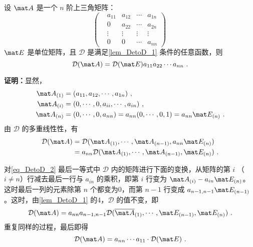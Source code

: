 \begin{lemma}{}\label{lem_DetoD_2}
设 $\mat A$ 是一个 $n$ 阶上三角矩阵：
\begin{equation}
\begin{pmatrix}
&a_{11}&a_{12}&\cdots&a_{1n}\\
&0&a_{22}&\cdots&a_{2n}\\
&\vdots&\vdots&\vdots&\vdots\\
&0&0&\cdots&a_{nn}
\end{pmatrix}~
\end{equation}
$\mat E$ 是单位矩阵，且 $\mathcal D$ 是满足\autoref{lem_DetoD_1} 条件的任意函数，则
\begin{equation}
\mathcal D(\mat A)=\mathcal D(\mat E)a_{11}a_{22}\cdots a_{nn}~.
\end{equation}
\end{lemma}

\textbf{证明：}显然，
\begin{equation}
\begin{aligned}
\mat A_{(1)}&=(a_{11},a_{12},\cdots,a_{1n})~,\\
\mat A_{(i)}&=(0,\cdots,0,a_{ii},\cdots,a_{in})~,\\
\mat A_{(n)}&=(0,\cdots,0,a_{nn})=a_{nn}(0,\cdots,0,1)=a_{nn}\mat E_{(n)}~.
\end{aligned}
\end{equation}
由 $\mathcal D$ 的多重线性性，有
\begin{equation}\label{eq_DetoD_2}
\begin{aligned}
\mathcal D(\mat A)&=\mathcal D(\mat A_{(1)},\cdots,\mat A_{(n-1)},a_{nn}\mat E_{(n)})\\
&=a_{nn}\mathcal D(\mat A_{(1)},\cdots,\mat A_{(n-1)},\mat E_{(n)})~.
\end{aligned}
\end{equation}

对\autoref{eq_DetoD_2} 最后一等式中 $\mathcal D$ 内的矩阵进行下面的变换，从矩阵的第 $i$ （$i\neq n$）行减去最后一行与 $a_{in}$ 的乘积，即第 $i$ 行变为 $\mat A_{(i)}-a_{in}\mat E_{(n)}$。这时最后一列的元素除第 $n$ 个都变为0，而第 $n-1$ 行变成 $a_{n-1,n-1}\mat E_{(n-1)}$。这时，由\autoref{lem_DetoD_1} 的4，$\mathcal D$ 的值不变，即
\begin{equation}
\mathcal D(\mat A)=a_{nn}a_{n-1,n-1}\mathcal D(\overline{\mat A}_{(1)},\cdots,\mat E_{(n-1)},\mat E_{(n)})~.
\end{equation}
重复同样的过程，最后即得
\begin{equation}
\mathcal D(\mat A)=a_{nn}\cdots a_{11}\cdot \mathcal D(\mat E)~.
\end{equation}

